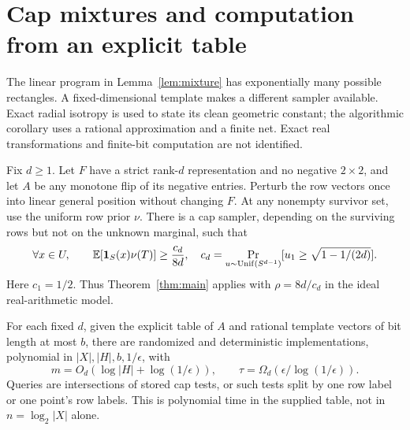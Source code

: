 \section{Cap mixtures and computation from an explicit table}\label{sec:caps}
The linear program in Lemma~\ref{lem:mixture} has exponentially many possible rectangles. A fixed-dimensional template makes a different sampler available. Exact radial isotropy is used to state its clean geometric constant; the algorithmic corollary uses a rational approximation and a finite net. Exact real transformations and finite-bit computation are not identified.

\begin{samepage}
\begin{theorem}\label{thm:caps}
Fix $d\ge1$. Let $F$ have a strict rank-$d$ representation and no negative $2\times2$, and let $A$ be any monotone flip of its negative entries. Perturb the row vectors once into linear general position without changing $F$. At any nonempty survivor set, use the uniform row prior $\nu$. There is a cap sampler, depending on the surviving rows but not on the unknown marginal, such that
\begin{equation}\label{eq:capcoverage}
 \forall x\in U,\qquad \mathbb E[\mathbf 1_S(x)\nu(T)]\ge\frac{c_d}{8d},
 \quad c_d=\Pr_{u\sim\mathrm{Unif}(S^{d-1})}
 [u_1\ge\sqrt{1-1/(2d)}].
\end{equation}
Here $c_1=1/2$. Thus Theorem~\ref{thm:main} applies with $\rho=8d/c_d$ in the ideal real-arithmetic model.

For each fixed $d$, given the explicit table of $A$ and rational template vectors of bit length at most $b$, there are randomized and deterministic implementations, polynomial in $|X|,|H|,b,1/\epsilon$, with
\[
 m=O_d(\log|H|+\log(1/\epsilon)),\qquad
 \tau=\Omega_d(\epsilon/\log(1/\epsilon)).
\]
Queries are intersections of stored cap tests, or such tests split by one row label or one point's row labels. This is polynomial time in the supplied table, not in $n=\log_2|X|$ alone.
\end{theorem}
\end{samepage}
